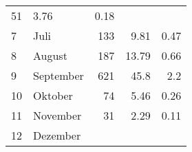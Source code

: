 \begin{longtable}{lXrrr}
       \num{51} &
       \num[round-mode=places,round-precision=2]{3.76} &
         \num[round-mode=places,round-precision=2]{0.18} \\

     7 &
     \multicolumn{1}{X}{ Juli   } &


       \num{133} &
       \num[round-mode=places,round-precision=2]{9.81} &
         \num[round-mode=places,round-precision=2]{0.47} \\

     8 &
     \multicolumn{1}{X}{ August   } &


       \num{187} &
       \num[round-mode=places,round-precision=2]{13.79} &
         \num[round-mode=places,round-precision=2]{0.66} \\

     9 &
     \multicolumn{1}{X}{ September   } &


       \num{621} &
       \num[round-mode=places,round-precision=2]{45.8} &
         \num[round-mode=places,round-precision=2]{2.2} \\

     10 &
     \multicolumn{1}{X}{ Oktober   } &


       \num{74} &
       \num[round-mode=places,round-precision=2]{5.46} &
         \num[round-mode=places,round-precision=2]{0.26} \\

     11 &
     \multicolumn{1}{X}{ November   } &


       \num{31} &
       \num[round-mode=places,round-precision=2]{2.29} &
         \num[round-mode=places,round-precision=2]{0.11} \\

     12 &
     \multicolumn{1}{X}{ Dezember   } &



\end{longtable}

